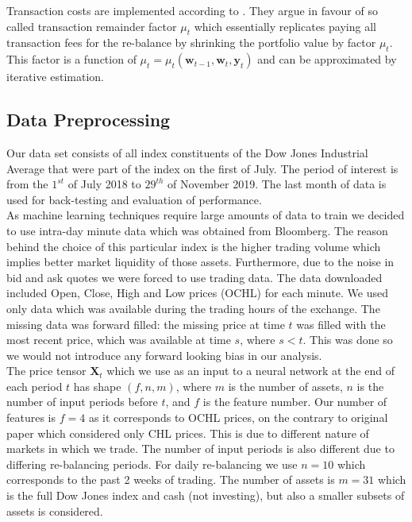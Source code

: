 \documentclass{article}
\begin{document}
Transaction costs are implemented according to \cite{ormos2013transaction}. They argue in favour of so called transaction remainder factor $\mu_t$ which essentially replicates paying all transaction fees for the re-balance by shrinking the portfolio value by factor $\mu_t$. This factor is a function of $\mu_t = \mu_t (\bm{w}_{t-1},\bm{w}_t,\bm{y}_t)$ and can be approximated by iterative estimation.

\subsection{Data Preprocessing}

Our data set consists of all index constituents of the Dow Jones Industrial Average that were part of the index on the first of July. The period of interest is from the $1^{st}$ of July 2018 to $29^{th}$ of November 2019. The last month of data is used for back-testing and evaluation of performance.\\

As machine learning techniques require large amounts of data to train we decided to use intra-day minute data which was obtained from Bloomberg. The reason behind the choice of this particular index is the higher trading volume which implies better market liquidity of those assets. Furthermore, due to the noise in bid and ask quotes we were forced to use trading data. The data downloaded included Open, Close, High and Low prices (OCHL) for each minute. We used only data which was available during the trading hours of the exchange. The missing data was forward filled: the missing price at time $t$ was filled with the most recent price, which was available at time $s$, where $s<t$. This was done so we would not introduce any forward looking bias in our analysis. \\

The price tensor $\bm{X}_t$ which we use as an input to a neural network at the end of each period $t$ has shape $(f,n,m)$, where $m$ is the number of assets, $n$ is the number of input periods before $t$, and $f$ is the feature number. Our number of features is $f=4$ as it corresponds to OCHL prices, on the contrary to original paper which considered only CHL prices. This is due to different nature of markets in which we trade. The number of input periods is also different due to differing re-balancing periods. For daily re-balancing we use $n=10$ which corresponds to the past 2 weeks of trading. The number of assets is $m=31$ which is the full Dow Jones index and cash (not investing), but also a smaller subsets of assets is considered.
\end{document}
